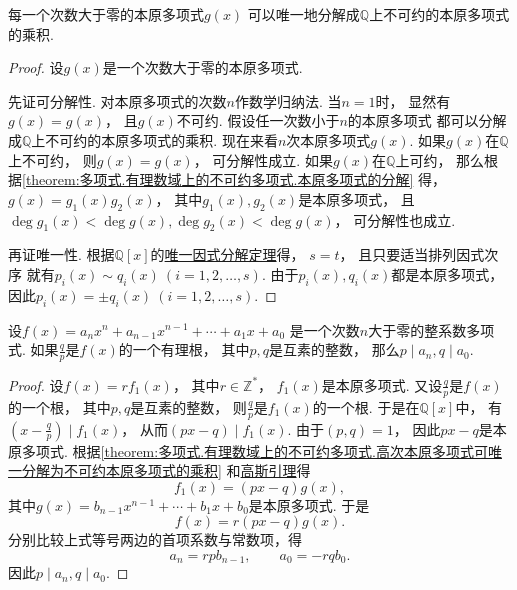 \begin{theorem}\label{theorem:多项式.有理数域上的不可约多项式.高次本原多项式可唯一分解为不可约本原多项式的乘积}
每一个次数大于零的本原多项式\(g(x)\)
可以唯一地分解成\(\mathbb{Q}\)上不可约的本原多项式的乘积.
\begin{proof}
设\(g(x)\)是一个次数大于零的本原多项式.

先证可分解性.
对本原多项式的次数\(n\)作数学归纳法.
当\(n=1\)时，
显然有\(g(x)=g(x)\)，
且\(g(x)\)不可约.
假设任一次数小于\(n\)的本原多项式
都可以分解成\(\mathbb{Q}\)上不可约的本原多项式的乘积.
现在来看\(n\)次本原多项式\(g(x)\).
如果\(g(x)\)在\(\mathbb{Q}\)上不可约，
则\(g(x)=g(x)\)，
可分解性成立.
如果\(g(x)\)在\(\mathbb{Q}\)上可约，
那么根据\cref{theorem:多项式.有理数域上的不可约多项式.本原多项式的分解} 得，
\(g(x)=g_1(x) g_2(x)\)，
其中\(g_1(x),g_2(x)\)是本原多项式，
且\(\deg g_1(x) < \deg g(x),
\deg g_2(x) < \deg g(x)\)，
可分解性也成立.

再证唯一性.
根据\(\mathbb{Q}[x]\)的\hyperref[theorem:多项式.唯一因式分解定理]{唯一因式分解定理}得，
\(s=t\)，
且只要适当排列因式次序
就有\(p_i(x) \sim q_i(x)\ (i=1,2,\dotsc,s)\).
由于\(p_i(x),q_i(x)\)都是本原多项式，
因此\(p_i(x)=\pm q_i(x)\ (i=1,2,\dotsc,s)\).
\end{proof}
\end{theorem}

\begin{theorem}\label{theorem:多项式.有理数域上的不可约多项式.正次整系数多项式的有理根的分子分母分别整除常数项和首项系数}
设\(f(x)=a_n x^n+a_{n-1} x^{n-1}+\dotsb+a_1 x+a_0\)
是一个次数\(n\)大于零的整系数多项式.
如果\(\frac{q}{p}\)是\(f(x)\)的一个有理根，
其中\(p,q\)是互素的整数，
那么\(p \mid a_n,
q \mid a_0\).
\begin{proof}
设\(f(x)=r f_1(x)\)，
其中\(r\in\mathbb{Z}^*\)，
\(f_1(x)\)是本原多项式.
又设\(\frac{q}{p}\)是\(f(x)\)的一个根，
其中\(p,q\)是互素的整数，
则\(\frac{q}{p}\)是\(f_1(x)\)的一个根.
于是在\(\mathbb{Q}[x]\)中，
有\(\left(x-\frac{q}{p}\right) \mid f_1(x)\)，
从而\((px-q) \mid f_1(x)\).
由于\((p,q)=1\)，
因此\(px-q\)是本原多项式.
根据\cref{theorem:多项式.有理数域上的不可约多项式.高次本原多项式可唯一分解为不可约本原多项式的乘积}
和\hyperref[theorem:多项式.有理数域上的不可约多项式.引理2]{高斯引理}得\begin{equation*}
	f_1(x)=(px-q) g(x),
\end{equation*}
其中\(g(x)=b_{n-1} x^{n-1}+\dotsb+b_1 x+b_0\)是本原多项式.
于是\begin{equation*}
	f(x)=r(px-q) g(x).
\end{equation*}
分别比较上式等号两边的首项系数与常数项，得\begin{equation*}
	a_n = r p b_{n-1}, \qquad
	a_0 = -r q b_0.
\end{equation*}
因此\(p \mid a_n,
q \mid a_0\).
\end{proof}
\end{theorem}

